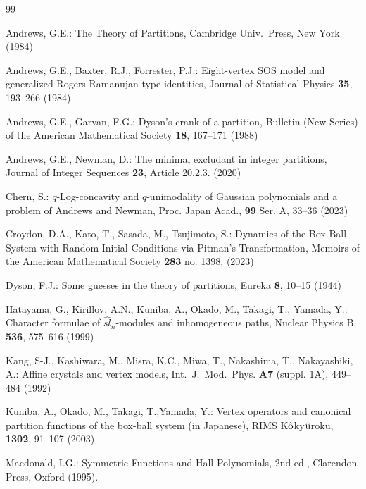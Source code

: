 \documentclass[sn-mathphys-num]{sn-jnl}%
\theoremstyle{thmstyleone}%
\theoremstyle{thmstyletwo}%
\theoremstyle{thmstylethree}%
\begin{document}
\begin{thebibliography}{99}%

Andrews, G.E.:
{The Theory of Partitions}, Cambridge Univ.~Press, New York
(1984)



Andrews, G.E., Baxter, R.J., Forrester, P.J.:
{Eight-vertex SOS model and generalized Rogers-Ramanujan-type identities},
{Journal of Statistical Physics} {\bf 35}, 193--266 (1984)

Andrews, G.E., Garvan, F.G.:
{Dyson's crank of a partition},
{Bulletin (New Series) of the American Mathematical Society} {\bf 18},
167--171 (1988) 

Andrews, G.E., Newman, D.:
{The minimal excludant in integer partitions},
{Journal of Integer Sequences} {\bf 23}, Article 20.2.3. (2020)


Chern, S.:
{$q$-Log-concavity and $q$-unimodality of Gaussian polynomials and a problem of
Andrews and Newman}, Proc. Japan Acad., {\bf 99} Ser. A, 33--36 (2023)

Croydon, D.A., Kato, T., Sasada, M., Tsujimoto, S.:
{Dynamics of the Box-Ball System with Random Initial Conditions via Pitman’s Transformation},
Memoirs of the American Mathematical Society
{\bf 283} no. 1398, (2023)

Dyson, F.J.:
{Some guesses in the theory of partitions},
{Eureka} {\bf 8},  10--15 (1944)

Hatayama, G., Kirillov, A.N., Kuniba, A., Okado, M., Takagi, T., Yamada, Y.:
Character formulae of $\widehat{sl}_n$-modules and inhomogeneous paths,
Nuclear Physics B, {\bf 536}, 575--616 (1999)


Kang, S-J., Kashiwara, M., Misra, K.C., Miwa, T., Nakashima, T., Nakayashiki, A.:
{Affine crystals and vertex models},
{Int.\ J.\ Mod.\ Phys.} {\bf A7} (suppl. 1A), 449--484 (1992)

Kuniba, A., Okado, M., Takagi, T.,Yamada, Y.:
{Vertex operators and canonical partition functions of the box-ball system}
(in Japanese), RIMS K$\hat{\rm o}$ky$\hat{\rm u}$roku, 
{\bf 1302}, 91--107 (2003)

Macdonald, I.G.:
{Symmetric Functions and Hall Polynomials},
2nd ed., Clarendon Press, Oxford (1995).


\end{thebibliography}
\end{document}
